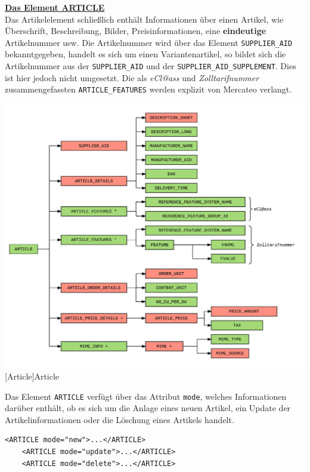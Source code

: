 	\textbf{\underline{Das Element ARTICLE}}\\
	Das Artikelelement schließlich enthält Informationen über einen Artikel, wie Überschrift, Beschreibung, Bilder, Preisinformationen, eine \textbf{eindeutige} Artikelnummer usw. Die Artikelnummer wird über das Element \texttt{SUPPLIER\_AID} bekanntgegeben, handelt es sich um einen Variantenartikel, so bildet sich die Artikelnummer aus der \texttt{SUPPLIER\_AID} und der \texttt{SUPPLIER\_AID\_SUPPLEMENT}. Dies ist hier jedoch nicht umgesetzt. Die als \textit{eCl@ass} und \textit{Zolltarifnummer} zusammengefassten \texttt{ARTICLE\_FEATURES} werden explizit von Mercateo verlangt.
	
	\begin{minipage}{\linewidth}
		\vspace{1em}
		\centering
		\includegraphics[width=1\linewidth]{img/Article}
		[Article]{Article}
		\label{fig:header}
		\vspace{1em}
	\end{minipage}
	
	Das Element \texttt{ARTICLE} verfügt über das Attribut \texttt{mode}, welches Informationen darüber enthält, ob es sich um die Anlage eines neuen Artikel, ein Update der Artikelinformationen oder die Löschung eines Artikels handelt.
	
	\begin{lstlisting}[caption={Die verschiedenen Artikelmodi}] 
	<ARTICLE mode="new">...</ARTICLE>
	<ARTICLE mode="update">...</ARTICLE>
	<ARTICLE mode="delete">...</ARTICLE>
	\end{lstlisting}
	\pagebreak
	
